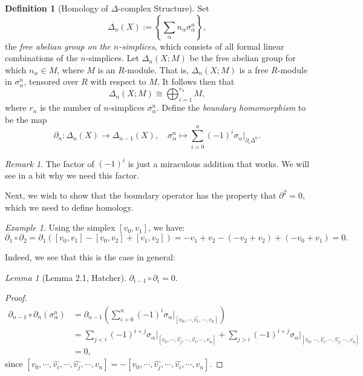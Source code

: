 \documentclass[a4paper]{report}
\theoremstyle{definition}
\newtheorem{definition}{Definition}
\theoremstyle{remark}
\newtheorem{remark}{Remark}
\theoremstyle{proposition}
\theoremstyle{conjecture}
\theoremstyle{lemma}
\newtheorem{lemma}{Lemma}
\theoremstyle{corollary}
\theoremstyle{exercise}
\newtheorem{example}{Example}
\begin{document}
\begin{definition}[Homology of $\Delta$-complex Structure]
    Set $$\Delta_n(X) := \left\lbrace \sum_\alpha n_\alpha \sigma_\alpha^n \right\rbrace,$$
    the \emph{free abelian group on the $n$-simplices}, which consists of all formal linear combinations of 
    the $n$-simplices. Let $\Delta_n(X;M)$ be the free abelian group for which $n_\alpha \in M$, where $M$ is an $R$-module.
    That is, $\Delta_n(X;M)$ is a free $R$-module in $\sigma_\alpha^n$, tensored over $R$ 
    with respect to $M$. It follows then that 
    $$\Delta_n(X;M) \cong \bigoplus_{i=1}^{r_n} M,$$ where $r_n$ is the number of $n$-simplices 
    $\sigma_\alpha^n$. Define the \emph{boundary homomorphism} to be the map 
    $$\partial_n : \Delta_n(X) \longrightarrow \Delta_{n-1}(X),\quad \sigma_\alpha^n \longmapsto \sum_{i=0}^n (-1)^i\sigma_\alpha\vert_{\partial_i\Delta^n}.$$
\end{definition}

\begin{remark}
    The factor of $(-1)^i$ is just a miraculous addition that works. We will see in a bit why 
    we need this factor.
\end{remark}

Next, we wish to show that the boundary operator has the property that $\partial^2 = 0$, which we need 
to define homology.

\begin{example}
    Using the simplex $[v_0,v_1]$, we have: 
    $$\partial_1 \circ \partial_2 = \partial_1 ([v_0,v_1] - [v_0,v_2] + [v_1,v_2]) = -v_1 + v_2 -(-v_2 + v_2) + (-v_0 + v_1) = 0.$$
\end{example}

Indeed, we see that this is the case in general:

\begin{lemma}[Lemma 2.1, Hatcher]
    $\partial_{i-1} \circ \partial_i = 0$.
\end{lemma}

\begin{proof}
    \begin{align*}
        \partial_{n-1} \circ \partial_n (\sigma_\alpha^n) &= \partial_{n-1} \left(\sum_{i=0}^n (-1)^i \sigma_\alpha\vert_{[v_0,\cdots,\widehat{v_i},\cdots, v_n]}\right)\\
        &= \sum_{j < i} (-1)^{i+j} \sigma_\alpha\vert_{[v_0,\cdots,\widehat{v_j},\cdots,\widehat{v_i},\cdots, v_n]}
        + \sum_{j > i} (-1)^{i+j} \sigma_\alpha\vert_{[v_0,\cdots,\widehat{v_i},\cdots,\widehat{v_j},\cdots, v_n]}\\
        &= 0,
    \end{align*}
    since $[v_0,\cdots,\widehat{v_i},\cdots,\widehat{v_j},\cdots,v_n] = - [v_0,\cdots,\widehat{v_j},\cdots, \widehat{v_i},\cdots,v_n]$.
\end{proof}
\end{document}
